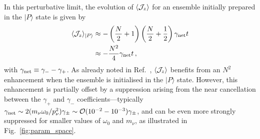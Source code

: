 \documentclass[aps,prd,10pt,twocolumn,superscriptaddress,floatfix,nofootinbib,amsmath,amssymb,altaffilletter,preprintnumbers]{revtex4-1}
\begin{document}
In this perturbative limit, the evolution of $\langle {\cal J}_z\rangle$ for an ensemble initially prepared in the $\vert P\rangle$ state is given by
\begin{equation}
\begin{aligned}
    \langle {\cal J}_z\rangle_{\vert P\rangle}& \approx -\left(\frac{N}{2}+1\right)\left(\frac{N}{2}+\frac{1}{2}\right)\gamma_{\rm net}t \\
    & \approx -\frac{N^2}{4}\gamma_{\rm net}t \, , 
    \label{eq:pert1}
    \end{aligned}
\end{equation} 
with $\gamma_{\rm net} \equiv \gamma_--\gamma_+$. As already noted in Ref.~\cite{Arvanitaki:2024taq}, $\langle {\cal J}_z\rangle$ benefits from an $N^2$ enhancement when the ensemble is initialised in the $|P \rangle$ state. However, this enhancement is partially offset by a suppression arising from the near cancellation between the $\gamma_+$ and $\gamma_-$ coefficients---typically 
$\gamma_{\rm net} \sim 2 (m_\nu \omega_0/p_\nu^2) \gamma_\pm \sim {\cal O}(10^{-2}-10^{-3})\gamma_\pm$, and can be even more strongly suppressed for smaller values of $\omega_0$ and $m_{\nu}$, as illustrated in Fig.~\ref{fig:param_space}. 
\end{document}

